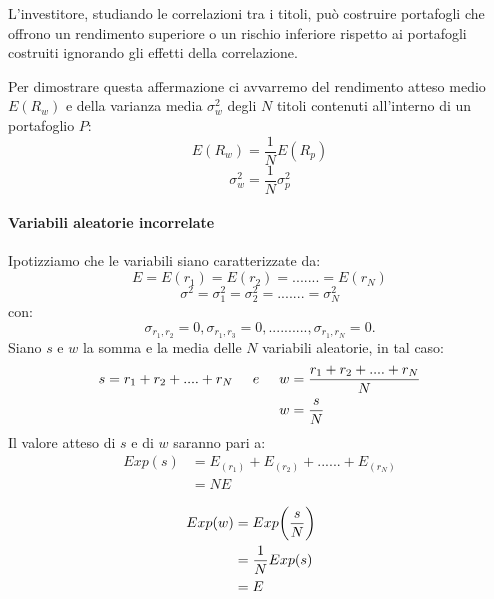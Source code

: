 L'investitore, studiando le correlazioni tra i titoli, può costruire portafogli che offrono un rendimento superiore o un rischio inferiore rispetto ai portafogli costruiti ignorando gli effetti della correlazione. 

Per dimostrare questa affermazione ci avvarremo del rendimento atteso medio ${E(R_{w})}$ e della varianza media $\sigma^{2}_w$ degli $N$ titoli  contenuti all'interno di un portafoglio $P$:  
\begin{equation}
\label{key}
{E(R_{w})}=\dfrac{1}{N} E(R_{p})
\end{equation}
\begin{equation}
\label{key}
\sigma^{2}_w= \dfrac{1}{N} \sigma^{2}_p 
\end{equation}

\paragraph{Variabili aleatorie incorrelate} Ipotizziamo che le variabili siano caratterizzate da: 
\begin{equation}
E= E(r_{1})= E(r_{2})= .......= E(r_{N})
\end{equation}
\begin{equation}
\sigma^{2}= \sigma^{2}_1=\sigma^{2}_2 =.......= \sigma^{2}_N 
\end{equation}
con:
\begin{equation}
\sigma_{r_1, r_2}=0, \sigma_{r_1, r_3}=0,..........,\sigma_{r_1, r_N}=0.
\end{equation}
Siano $s$ e $w$ la somma e la media delle $N$ variabili aleatorie, in tal caso:
\begin{equation}
\begin{split}
s= r_{1}+ r_{2}+....+r_{N} \hspace{0,5cm}e \hspace{0,5cm} w &=\dfrac{r_{1}+ r_{2}+....+r_{N}}{N} \\
w &=\dfrac{s}{N}
\end{split}
\end{equation}
Il valore atteso di $s$ e di $w$ saranno pari a:
\begin{equation}
\begin{split}
Exp(s) &= E_(r_{1})+E_(r_{2})+ ...... + E_(r_{N})\\
 &= N E \\
 \end{split}
 \end{equation}
 \begin{equation}
 \begin{split}
Exp(w)&= Exp\bigg(\dfrac{s}{N}\bigg)\\
& = \dfrac{1}{N}Exp(s) \hspace{0,5cm} \\
& = E
 \end{split}
\end{equation}
